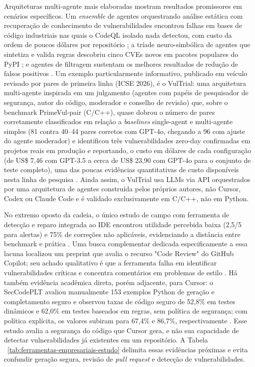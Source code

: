 Arquiteturas multi-agente mais elaboradas mostram resultados promissores em cenários específicos. Um \textit{ensemble} de agentes orquestrando análise estática com recuperação de conhecimento de vulnerabilidades encontrou falhas em bases de código industriais nas quais o CodeQL isolado nada detectou, com custo da ordem de poucos dólares por repositório \cite{Liang2026Argus}; a tríade neuro-simbólica de agentes que sintetiza e valida regras descobriu cinco CVEs novos em pacotes populares do PyPI \cite{Tsigkourakos2026QRS}; e agentes de filtragem sustentam os melhores resultados de redução de falsos positivos \cite{Ameen2026QASecClaw}. Um exemplo particularmente informativo, publicado em veículo revisado por pares de primeira linha (ICSE 2026), é o VulTrial: uma arquitetura multi-agente inspirada em um julgamento (agentes com papéis de pesquisador de segurança, autor do código, moderador e conselho de revisão) que, sobre o benchmark PrimeVul-pair (C/C++), quase dobrou o número de pares corretamente classificados em relação a \textit{baselines} single-agent e multi-agente simples (81 contra 40–44 pares corretos com GPT-4o, chegando a 96 com ajuste do agente moderador) e identificou três vulnerabilidades zero-day confirmadas em projetos reais em produção e reportando,  o custo em dólares de cada configuração (de US\$ 7,46 com GPT-3.5 a cerca de US\$ 23,90 com GPT-4o para o conjunto de teste completo), uma das poucas evidências quantitativas de custo disponíveis nesta linha de pesquisa \cite{Widyasari2026VulTrial}. Ainda assim, o VulTrial usa LLMs via API orquestrados por uma arquitetura de agentes construída pelos próprios autores, não Cursor, Codex ou Claude Code e é validado exclusivamente em C/C++, não em Python.

No extremo oposto da cadeia, o único estudo de campo com ferramenta de detecção e reparo integrada ao IDE encontrou utilidade percebida baixa (2,5/5 para alertas) e 75\% de correções não aplicáveis, evidenciando a distância entre benchmark e prática \cite{Steenhoek2025IDEUserStudy}. Uma busca complementar dedicada especificamente a essa lacuna localizou um preprint que avalia o recurso "Code Review" do GitHub Copilot; seu achado qualitativo é que a ferramenta falha em identificar vulnerabilidades críticas e concentra comentários em problemas de estilo \cite{Amro2025CopilotReview}. Há também evidência acadêmica direta, porém adjacente, para Cursor: o SecCodePLT avaliou manualmente 153 exemplos Python de geração e completamento seguro e observou taxas de código seguro de 52,8\% em testes dinâmicos e 62,0\% em testes baseados em regras, sem política de segurança; com política explícita, os valores subiram para 67,4\% e 86,7\%, respectivamente \cite{Nie2025SecCodePLT}. Esse estudo avalia a segurança do código que Cursor gera, e não sua capacidade de detectar vulnerabilidades já existentes em um repositório. A Tabela ~\ref{tab:ferramentas-empresariais-estudo} delimita essas evidências próximas e evita confundir geração segura, revisão de \textit{pull request} e detecção de vulnerabilidades.



